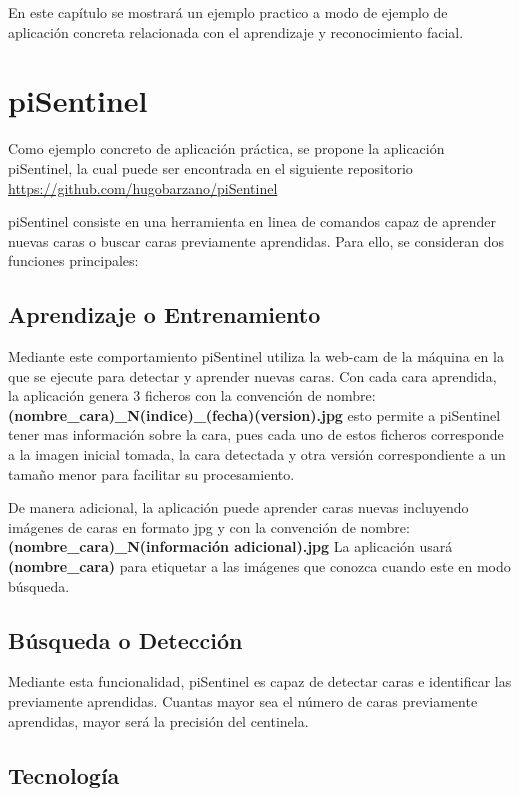 \documentclass[a4paper,11pt]{book}
\begin{document}
En este capítulo se mostrará un ejemplo practico a modo de ejemplo de aplicación concreta relacionada con el aprendizaje y reconocimiento facial. 

\section{piSentinel}

Como ejemplo concreto de aplicación práctica, se propone la aplicación piSentinel, la cual puede ser encontrada en el siguiente repositorio \url{https://github.com/hugobarzano/piSentinel}

piSentinel consiste en una herramienta en linea de comandos capaz de aprender nuevas caras o buscar caras previamente aprendidas.  Para ello, se consideran dos funciones principales:

\subsection{Aprendizaje o Entrenamiento}

Mediante este comportamiento piSentinel utiliza la web-cam de la máquina en la que se ejecute para detectar y aprender nuevas caras.
Con cada cara aprendida, la aplicación genera 3 ficheros  con la convención de nombre:
\textbf{(nombre\_cara)\_N(indice)\_(fecha)(version).jpg} esto permite a  piSentinel tener mas información sobre la cara, pues cada uno de estos ficheros 
corresponde a la imagen inicial tomada, la cara detectada y otra versión correspondiente a un tamaño menor para facilitar su procesamiento. 

 De manera adicional, la aplicación puede aprender caras nuevas incluyendo  imágenes de caras en  formato jpg y con la convención de nombre: \textbf{(nombre\_cara)\_N(información adicional).jpg}  La aplicación usará \textbf{(nombre\_cara)} para etiquetar a las imágenes que conozca cuando este en modo búsqueda. 

\subsection{Búsqueda o Detección} 

Mediante esta funcionalidad, piSentinel es capaz de detectar caras e identificar las previamente aprendidas. Cuantas mayor sea el número de caras previamente aprendidas, mayor será la precisión del centinela. 

\subsection{Tecnología} 
\end{document}
